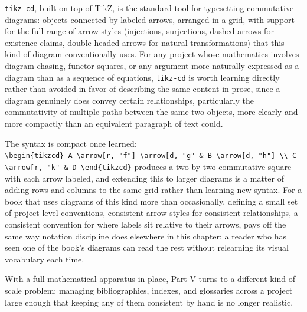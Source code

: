 \texttt{tikz-cd}, built on top of TikZ, is the standard tool for typesetting commutative diagrams: objects connected by labeled arrows, arranged in a grid, with support for the full range of arrow styles (injections, surjections, dashed arrows for existence claims, double-headed arrows for natural transformations) that this kind of diagram conventionally uses. For any project whose mathematics involves diagram chasing, functor squares, or any argument more naturally expressed as a diagram than as a sequence of equations, \texttt{tikz-cd} is worth learning directly rather than avoided in favor of describing the same content in prose, since a diagram genuinely does convey certain relationships, particularly the commutativity of multiple paths between the same two objects, more clearly and more compactly than an equivalent paragraph of text could.

The syntax is compact once learned: \texttt{\textbackslash{}begin\{tikzcd\}\ A\ \textbackslash{}arrow{[}r,\ "f"{]}\ \textbackslash{}arrow{[}d,\ "g"\textquotesingle{}{]}\ \&\ B\ \textbackslash{}arrow{[}d,\ "h"{]}\ \textbackslash{}\textbackslash{}\ C\ \textbackslash{}arrow{[}r,\ "k"\textquotesingle{}{]}\ \&\ D\ \textbackslash{}end\{tikzcd\}} produces a two-by-two commutative square with each arrow labeled, and extending this to larger diagrams is a matter of adding rows and columns to the same grid rather than learning new syntax. For a book that uses diagrams of this kind more than occasionally, defining a small set of project-level conventions, consistent arrow styles for consistent relationships, a consistent convention for where labels sit relative to their arrows, pays off the same way notation discipline does elsewhere in this chapter: a reader who has seen one of the book's diagrams can read the rest without relearning its visual vocabulary each time.

With a full mathematical apparatus in place, Part V turns to a different kind of scale problem: managing bibliographies, indexes, and glossaries across a project large enough that keeping any of them consistent by hand is no longer realistic.
